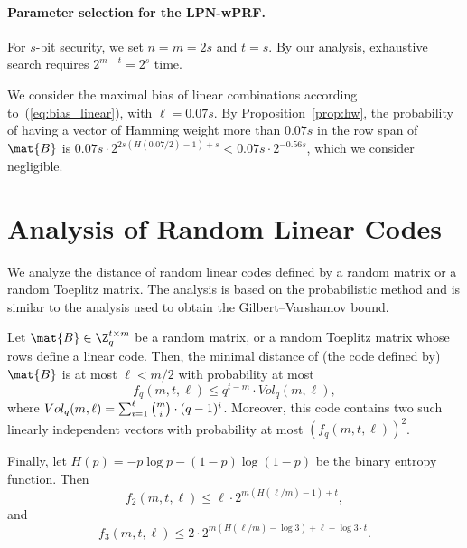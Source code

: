 \paragraph{Parameter selection for the LPN-wPRF.}
For $s$-bit security, we set $n=m= 2s$ and $t =s$.
By our analysis, exhaustive search requires $2^{m - t} = 2^s$ time.

We consider the maximal bias of linear combinations according to~(\ref{eq:bias_linear}),
with $\ell = 0.07 s$.
By Proposition~\ref{prop:hw},
the probability of having a vector of Hamming weight more than $0.07 s$
in the row span of $\mat{B}$ is
$0.07 s \cdot 2^{2s (H(0.07/2) - 1) + s} < 0.07 s \cdot 2^{-0.56 s}$,
which we consider negligible.


\section{Analysis of Random Linear Codes}
\label{app:distance}

We analyze the distance of random linear codes defined by a random matrix
or a random Toeplitz matrix.
The analysis is based on the probabilistic method and is
similar to the analysis used to obtain the Gilbert–Varshamov bound.

\begin{proposition}
\label{prop:hw}
Let $\mat{B} \in \Z^{t \times m}_{q}$ be a random matrix, or a random Toeplitz matrix whose rows define
a linear code.
Then, the minimal distance of (the code defined by) $\mat{B}$ is at most $\ell < m/2$ with probability at most
$$f_q(m,t,\ell) \leq q^{t-m} \cdot Vol_q(m,\ell),$$
where $Vol_q(m,\ell) = \sum_{i=1}^\ell \tbinom{m}{i} \cdot (q-1)^{i}$.
Moreover, this code contains two such linearly independent vectors with probability at most $(f_q(m,t,\ell))^2$.

Finally, let $H(p) = - p \log p - (1-p) \log(1-p)$ be the binary entropy function.
Then
$$f_2(m,t,\ell) \leq \ell \cdot 2^{m (H(\ell/m) - 1) + t},$$
and
$$f_3(m,t,\ell) \leq 2 \cdot 2^{m (H(\ell/m) - \log 3) + \ell + \log 3 \cdot t}.$$
\end{proposition}

